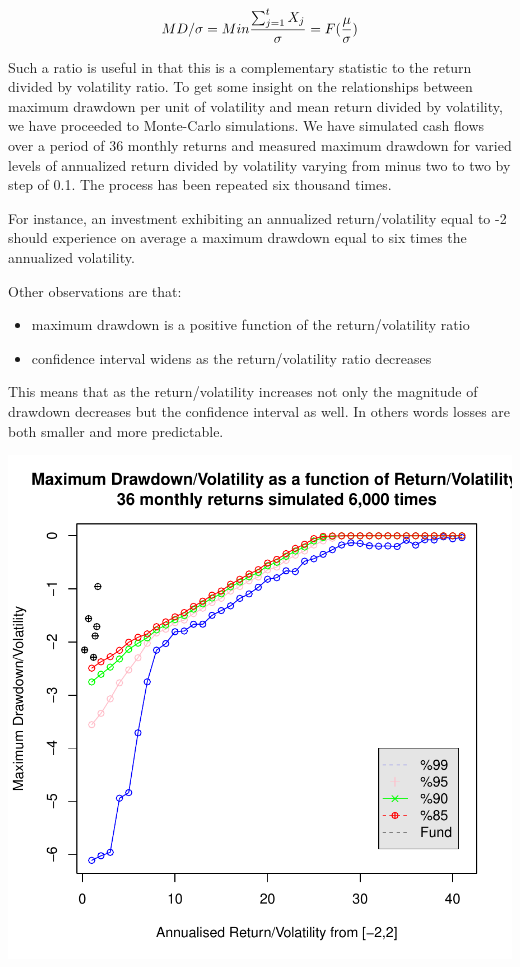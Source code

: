 \documentclass[12pt,letterpaper,english]{article}
\begin{document}
\begin{equation}
MD / \sigma =  Min \frac{ \sum_{j=1}^{t} X_{j}}{\sigma} = F(\frac{\mu}{\sigma}) \\
\end{equation}

Such a ratio is useful in that this is a complementary statistic to the return divided by volatility ratio. To get some insight on the relationships between maximum drawdown per unit of volatility and mean  return divided by volatility, we have proceeded to Monte-Carlo simulations. We have simulated cash flows over a period of 36 monthly returns and measured maximum drawdown for varied levels of  annualized return divided by volatility varying from minus two to two by step of 0.1. The process has  been repeated six thousand times.

For instance, an investment exhibiting an annualized return/volatility equal to -2 
should experience on average a maximum drawdown equal to six times the annualized volatility. 

Other observations are that: 
\begin{itemize}
\item maximum drawdown is a positive function of the return/volatility ratio 
\item confidence interval widens as the return/volatility ratio decreases  
\end{itemize}

This means that as the return/volatility increases not only the magnitude of drawdown decreases but the confidence interval as well. In others words losses are both smaller and more predictable.

\includegraphics{Managers-009}
\end{document}
